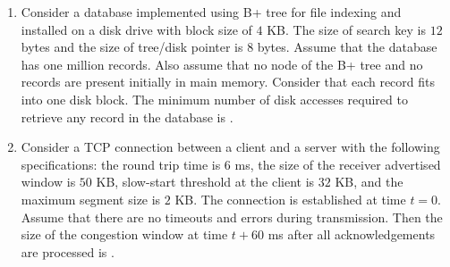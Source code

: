 \documentclass[journal,12pt,onecolumn]{IEEEtran}
\theoremstyle{remark}
\begin{document}
\begin{enumerate}
\item Consider a database implemented using B+ tree for file indexing and installed on a disk drive with block size of $4$ KB. The size of search key is $12$ bytes and the size of tree/disk pointer is $8$ bytes. Assume that the database has one million records. Also assume that no node of the B+ tree and no records are present initially in main memory. Consider that each record fits into one disk block. The minimum number of disk accesses required to retrieve any record in the database is \underline{\hspace{2cm}}.
\hfill{}\\
 
\item Consider a TCP connection between a client and a server with the following specifications: the round trip time is $6$ ms, the size of the receiver advertised window is $50$ KB, slow-start threshold at the client is $32$ KB, and the maximum segment size is $2$ KB. The connection is established at time $t = 0$. Assume that there are no timeouts and errors during transmission. Then the size of the congestion window  at time $t + 60$ ms after all acknowledgements are processed is \underline{\hspace{2cm}}.
\hfill{}
	

\end{enumerate}
\end{document}
